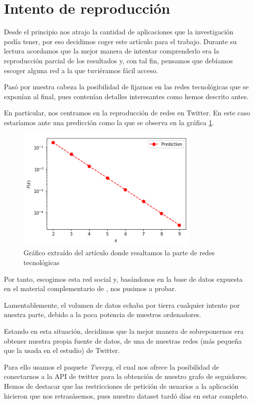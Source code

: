 \documentclass[1p]{elsarticle}
\begin{document}
\section{Intento de reproducción}
Desde el principio nos atrajo la cantidad de aplicaciones que la investigación podía tener, por eso decidimos coger este artículo para el trabajo. Durante su lectura acordamos que la mejor manera de intentar comprenderlo era la reproducción parcial de los resultados y, con tal fin, pensamos que debíamos escoger alguna red a la que tuviéramos fácil acceso.

Pasó por nuestra cabeza la posibilidad de fijarnos en las redes tecnológicas que se exponían al final, pues contenían detalles interesantes como hemos descrito antes.

En particular, nos centramos en la reproducción de redes en Twitter. En este caso estaríamos ante una predicción como la que se observa en la gráfica \ref{h2}.
\begin{figure}
	\centering
	\includegraphics[width=9cm]{graf_4.png}
	\caption{Gráfico extraído del artículo donde resaltamos la parte de redes tecnológicas}
	\label{h2}
\end{figure}


Por tanto, escogimos esta red social y, basándonos en la base de datos expuesta en el material complementario de \cite{arti}, nos pusimos a probar.

Lamentablemente, el volumen de datos echaba por tierra cualquier intento por nuestra parte, debido a la poca potencia de nuestros ordenadores. 

Estando en esta situación, decidimos que la mejor manera de sobreponernos era obtener nuestra propia fuente de datos, de una de nuestras redes (más pequeña que la usada en el estudio) de Twitter.

Para ello usamos el paquete \textit{Tweepy}, el cual nos ofrece la posibilidad de conectarnos a la API de twitter para la obtención de nuestro grafo de seguidores. Hemos de destacar que las restricciones de petición de usuarios a la aplicación hicieron que nos retrasásemos, pues nuestro dataset tardó días en estar completo.
\end{document}
